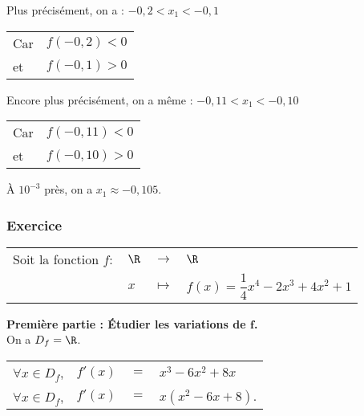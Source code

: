 Plus précisément, on a : $-0,2 < x_1 < -0,1$ \\

\begin{tabular}{ll}
Car & $f(-0,2) < 0$ \\
et & $f(-0,1) > 0$ \\
\end{tabular}

\vspace*{.3cm}

Encore plus précisément, on a même : $-0,11 < x_1 < -0,10$ \\

\begin{tabular}{ll}
Car & $f(-0,11) < 0$ \\
et & $f(-0,10) > 0$ \\
\end{tabular}

\vspace*{.3cm}

À $10^{-3}$ près, on a $x_1 \approx -0,105$. \\

\newpage

\subsubsection{Exercice }

\begin{tabular}{llll}
Soit la fonction $f :$ & $\R$ & $\longrightarrow$ & $\R$ \\
& $x$ & $\longmapsto$ & $f(x) = \dfrac{1}{4}x^4 - 2x^3 + 4x^2 + 1$ \\
\end{tabular}

\vspace*{.3cm}

\textbf{Première partie : Étudier les variations de $\mathbf{f}$.} \\

On a $D_f = \R$. \\

\begin{tabular}{llll}
$\forall x \in D_f$, & $f'(x)$ & $=$ & $x^3 - 6x^2 + 8x$ \\
$\forall x \in D_f$, & $f'(x)$ & $=$ & $x\left(x^2 - 6x + 8\right)$. \\
\end{tabular}

\vspace*{.3cm}

